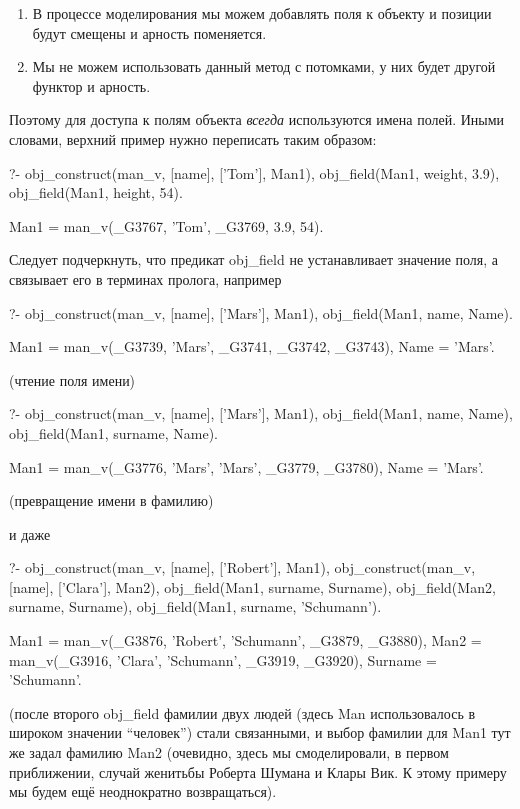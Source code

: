 \documentclass[a4paper]{book}
\begin{document}
\begin{enumerate}
\item В процессе моделирования мы можем добавлять поля к объекту и
позиции будут смещены и арность поменяется.
\item Мы не можем использовать данный метод с потомками, у них будет
другой функтор и арность.
\end{enumerate}

Поэтому для доступа к полям объекта {\it всегда\/} используются
имена полей. Иными словами, верхний пример нужно переписать таким
образом:

\begin{example}{}{}
?- obj_construct(man_v, [name], ['Tom'], Man1), 
   obj_field(Man1, weight, 3.9), 
   obj_field(Man1, height, 54).

Man1 = man_v(_G3767, 'Tom', _G3769, 3.9, 54).
\end{example}

Следует подчеркнуть, что предикат obj_field не устанавливает
значение поля, а связывает его в терминах пролога, например

\begin{example}{}{}
?- obj_construct(man_v, [name], ['Mars'], Man1), 
   obj_field(Man1, name, Name).

Man1 = man_v(_G3739, 'Mars', _G3741, _G3742, _G3743),
Name = 'Mars'.
\end{example}
(чтение поля имени)

\begin{example}{}{}
?- obj_construct(man_v, [name], ['Mars'], Man1), 
   obj_field(Man1, name, Name), 
   obj_field(Man1, surname, Name).

Man1 = man_v(_G3776, 'Mars', 'Mars', _G3779, _G3780),
Name = 'Mars'.
\end{example}
(превращение имени в фамилию)

и даже

\begin{example}{}{}
?- obj_construct(man_v, [name], ['Robert'], Man1), 
   obj_construct(man_v, [name], ['Clara'], Man2), 
   obj_field(Man1, surname, Surname), 
   obj_field(Man2, surname, Surname), 
   obj_field(Man1, surname, 'Schumann').

Man1 = man_v(_G3876, 'Robert', 'Schumann', _G3879, _G3880),
Man2 = man_v(_G3916, 'Clara', 'Schumann', _G3919, _G3920),
Surname = 'Schumann'.
\end{example}

(после второго obj_field фамилии двух людей (здесь Man
использовалось в широком значении ``человек'') стали связанными,
и выбор фамилии для Man1 тут же задал фамилию Man2 (очевидно,
здесь мы смоделировали, в первом приближении, случай женитьбы
Роберта Шумана и Клары Вик. К этому примеру мы будем ещё
неоднократно возвращаться).
\end{document}
